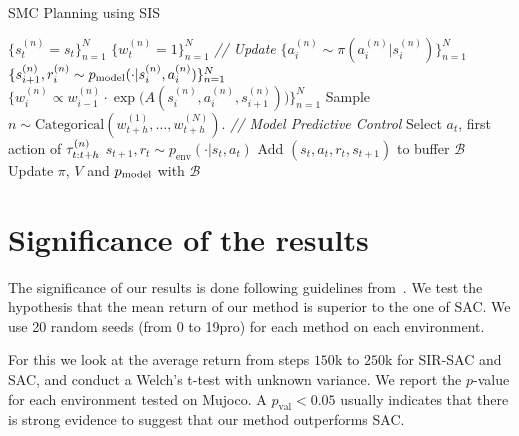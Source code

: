 \begin{algorithm}[H]
\caption{SMC Planning using SIS}
\label{alg:sis_planning}
\begin{algorithmic}[1]
\STATE $\{ s^{(n)}_t = s_t\}_{n=1}^N$
\STATE  $\{w^{(n)}_t =1\}_{n=1}^N$
\STATE \textit{// Update}
\STATE $\{a^{(n)}_{i} \sim \pi(a^{(n)}_{i}|s^{(n)}_{i})\}_{n=1}^N$
\STATE $\{s^{(n)}_{i+1}, r^{(n)}_{i} \sim p_{\rm{model}}(\cdot | s^{(n)}_{i}, a^{(n)}_{i})\}_{n=1}^N$
\STATE $\{w_i^{(n)} \propto w^{(n)}_{i-1} \cdot \exp \big( A(s^{(n)}_{i}, a^{(n)}_{i}, s^{(n)}_{i+1}) \big) \}_{n=1}^N$
\ENDFOR
\STATE Sample $n \sim \text{Categorical}(w_{t+h}^{(1)}, \ldots, w_{t+h}^{(N)})$.
\STATE \textit{// Model Predictive Control}
\STATE Select $a_t$, first action of $\tau^{(n)}_{t:t+h}$
\STATE $s_{t+1}, r_t \sim p_{\text{env}}(\cdot|s_t, a_t)$
\STATE Add $(s_t, a_t, r_t, s_{t+1})$ to buffer $\mathcal{B}$
\STATE Update $\pi$, $V$ and $p_{\rm{model}}$ with $\mathcal{B}$
\ENDFOR
\end{algorithmic}
\end{algorithm}

\section{Significance of the results}
\label{sec:significance}
The significance of our results is done following guidelines from~\citet{colas2018many}. We test the hypothesis that the mean return of our method is superior to the one of SAC. We use 20 random seeds (from 0 to 19pro) for each method on each environment.

For this we look at the average return from steps $150$k to $250$k for SIR-SAC and SAC, and conduct a Welch's t-test with unknown variance. We report the $p$-value for each environment tested on Mujoco. A 
$p_{\text{val}} < 0.05$ usually indicates that there is strong evidence to suggest that our method outperforms SAC.

